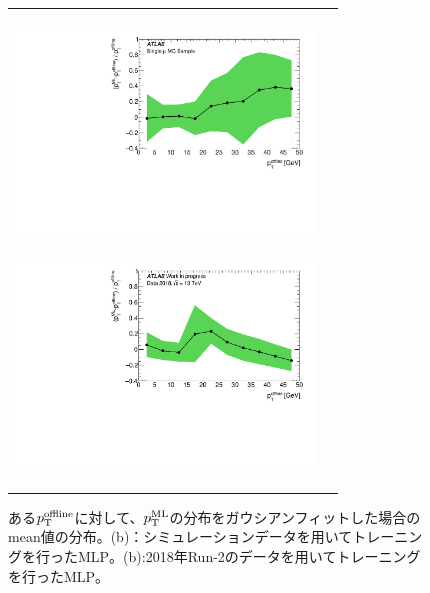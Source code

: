 \begin{figure}
    \begin{tabular}{cc}
    \centering
    \begin{minipage}[b]{0.45\hsize}%
        \centering
        \hspace*{-1.5cm}
        \includegraphics[clip, width=8cm]{fig/4/MC_predtrue_perpt_v1.pdf}
        \subcaption{}
        \label{Gauspredtrue_MC}
    \end{minipage}%
    \begin{minipage}[b]{0.7\hsize}%
        \centering
        \hspace*{-0.5cm}
        \includegraphics[clip, width=8cm]{fig/4/predtrue_perpt_error_v1.pdf}
        \subcaption{}
        \label{Gauspredtrue_data}
    \end{minipage}%
    \end{tabular}
    \caption{ある$p_{\rm{T}}^{\rm{offline}}$に対して、$p_{\rm{T}}^{\rm{ML}}$の分布をガウシアンフィットした場合のmean値の分布。(b)：シミュレーションデータを用いてトレーニングを行ったMLP。(b):2018年Run-2のデータを用いてトレーニングを行ったMLP。}
    \label{Gauspredtrue}
\end{figure}


